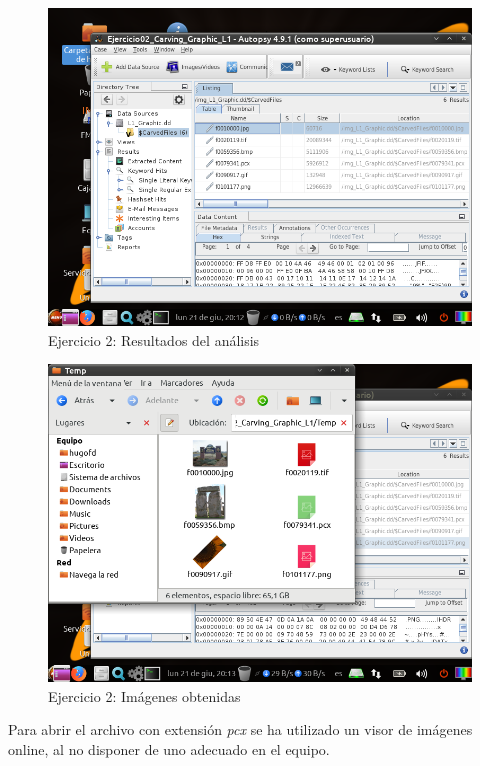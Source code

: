 \documentclass[11pt]{article}
\begin{document}
\begin{figure}[H]
  \caption{Ejercicio 2: Resultados del análisis}
  \centering
  \includegraphics[scale=0.7]{e2-5.png}
\end{figure}

\begin{figure}[H]
  \caption{Ejercicio 2: Imágenes obtenidas}
  \centering
  \includegraphics[scale=0.7]{e2-6.png}
\end{figure}

Para abrir el archivo con extensión \textit{pcx} se ha utilizado un visor de imágenes online, al no disponer de uno adecuado en el equipo.



\begin{thebibliography}{8}
\end{thebibliography}
\end{document}
